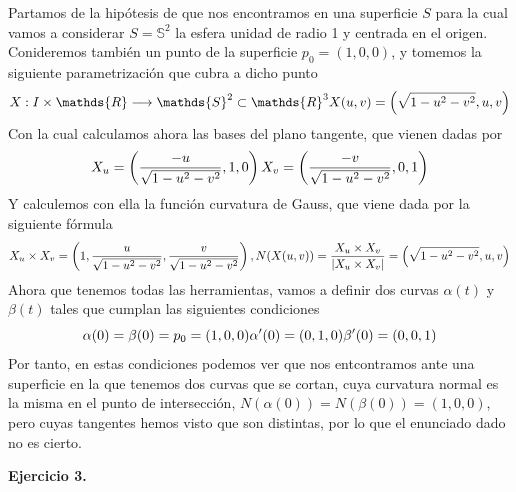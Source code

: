 \documentclass[fleqn]{article}
\def\R{\mathds{R}}
\begin{document}
    Partamos de la hipótesis de que nos encontramos en una superficie $S$ para la cual vamos a considerar $S=\mathds{S}^2$ la esfera unidad de radio 1 y centrada en el origen. 
    Conideremos también un punto de la superficie $p_0 = (1,0,0)$, y tomemos la siguiente parametrización que cubra a dicho punto
    \begin{equation*}
        X: I\times \R \longrightarrow \mathds{S}^2 \subset \R^3 \\
        X(u,v) = \left(\sqrt{1-u^2-v^2}, u, v\right)
    \end{equation*} 
    Con la cual calculamos ahora las bases del plano tangente, que vienen dadas por
    \begin{equation*}
        X_u = \left(\frac{-u}{\sqrt{1-u^2-v^2}}, 1, 0\right) \\
        X_v = \left(\frac{-v}{\sqrt{1-u^2-v^2}}, 0, 1\right)    
    \end{equation*}
    Y calculemos con ella la función curvatura de Gauss, que viene dada por la siguiente fórmula
    \begin{equation*}
        X_u \times X_v = \left(1, \frac{u}{\sqrt{1-u^2-v^2}}, \frac{v}{\sqrt{1-u^2-v^2}}\right), \quad\\
        N(X(u,v)) = \frac{X_u \times X_v}{|X_u \times X_v|} = \left(\sqrt{1-u^2-v^2}, u, v\right)
    \end{equation*}
    Ahora que tenemos todas las herramientas, vamos a definir dos curvas $\alpha(t)$ y $\beta(t)$ tales que cumplan las siguientes condiciones
    \begin{equation*}
        \alpha(0) = \beta(0) = p_0 = (1,0,0) \\
        \alpha'(0) = (0,1,0) \\
        \beta' (0) = (0,0,1)
    \end{equation*}
    Por tanto, en estas condiciones podemos ver que nos entcontramos ante una superficie en la que tenemos dos curvas que se cortan, cuya curvatura normal es la misma en el 
    punto de intersección, $N(\alpha(0)) = N(\beta(0)) = (1,0,0)$, pero cuyas tangentes hemos visto que son distintas, por lo que el enunciado dado no es cierto.

    \textbf{Ejercicio 3. } \\
\end{document}
